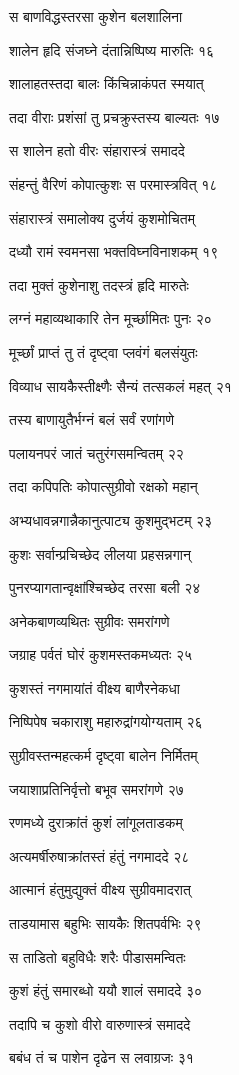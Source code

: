 स बाणविद्धस्तरसा कुशेन बलशालिना

शालेन हृदि संजघ्ने दंतान्निष्पिष्य मारुतिः १६

शालाहतस्तदा बालः किंचिन्नाकंपत स्मयात्

तदा वीराः प्रशंसां तु प्रचक्रुस्तस्य बाल्यतः १७

स शालेन हतो वीरः संहारास्त्रं समाददे

संहन्तुं वैरिणं कोपात्कुशः स परमास्त्रवित् १८

संहारास्त्रं समालोक्य दुर्जयं कुशमोचितम्

दध्यौ रामं स्वमनसा भक्तविघ्नविनाशकम् १९

तदा मुक्तं कुशेनाशु तदस्त्रं हृदि मारुतेः

लग्नं महाव्यथाकारि तेन मूर्च्छामितः पुनः २०

मूर्च्छां प्राप्तं तु तं दृष्ट्वा प्लवंगं बलसंयुतः

विव्याध सायकैस्तीक्ष्णैः सैन्यं तत्सकलं महत् २१

तस्य बाणायुतैर्भग्नं बलं सर्वं रणांगणे

पलायनपरं जातं चतुरंगसमन्वितम् २२

तदा कपिपतिः कोपात्सुग्रीवो रक्षको महान्

अभ्यधावन्नगान्नैकानुत्पाट्य कुशमुद्भटम् २३

कुशः सर्वान्प्रचिच्छेद लीलया प्रहसन्नगान्

पुनरप्यागतान्वृक्षांश्चिच्छेद तरसा बली २४

अनेकबाणव्यथितः सुग्रीवः समरांगणे

जग्राह पर्वतं घोरं कुशमस्तकमध्यतः २५

कुशस्तं नगमायांतं वीक्ष्य बाणैरनेकधा

निष्पिपेष चकाराशु महारुद्रांगयोग्यताम् २६

सुग्रीवस्तन्महत्कर्म दृष्ट्वा बालेन निर्मितम्

जयाशाप्रतिनिर्वृत्तो बभूव समरांगणे २७

रणमध्ये दुराक्रांतं कुशं लांगूलताडकम्

अत्यमर्षीरुषाक्रांतस्तं हंतुं नगमाददे २८

आत्मानं हंतुमुद्युक्तं वीक्ष्य सुग्रीवमादरात्

ताडयामास बहुभिः सायकैः शितपर्वभिः २९

स ताडितो बहुविधैः शरैः पीडासमन्वितः

कुशं हंतुं समारब्धो ययौ शालं समाददे ३०

तदापि च कुशो वीरो वारुणास्त्रं समाददे

बबंध तं च पाशेन दृढेन स लवाग्रजः ३१

